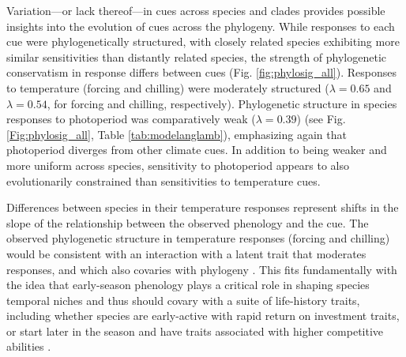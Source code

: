 \documentclass[11pt]{article}
\begin{document}
Variation---or lack thereof---in cues across species and clades provides possible insights into the evolution of cues across the phylogeny. While responses to each cue were phylogenetically structured, with closely related species exhibiting more similar sensitivities than distantly related species, the strength of phylogenetic conservatism in response differs between cues (Fig. \ref{fig:phylosig_all}). Responses to temperature (forcing and chilling) were moderately structured ($\lambda = 0.65$ and $\lambda = 0.54$, for forcing and chilling, respectively). Phylogenetic structure in species responses to photoperiod was comparatively weak ($\lambda= 0.39$) (see Fig. \ref{Fig:phylosig_all}, Table \ref{tab:modelanglamb}), emphasizing again that photoperiod diverges from other climate cues. In addition to being weaker and more uniform across species, sensitivity to photoperiod appears to also  evolutionarily constrained than sensitivities to temperature cues. %

Differences between species in their temperature responses represent shifts in the slope of the relationship between the observed phenology and the cue. The observed phylogenetic structure in temperature responses (forcing and chilling) would be consistent with an interaction with a latent trait that moderates responses, and which also covaries with phylogeny \citep{davies2019phylogenetically}. This fits fundamentally with the idea that early-season phenology plays a critical role in shaping species temporal niches \citep{gotelli1996} and thus should covary with a suite of life-history traits, including whether species are early-active with rapid return on investment traits, or start later in the season and have traits associated with higher competitive abilities \citep[e.g.,][]{Grime:1977sw,wolkovich2014aob}. 

\end{document}
